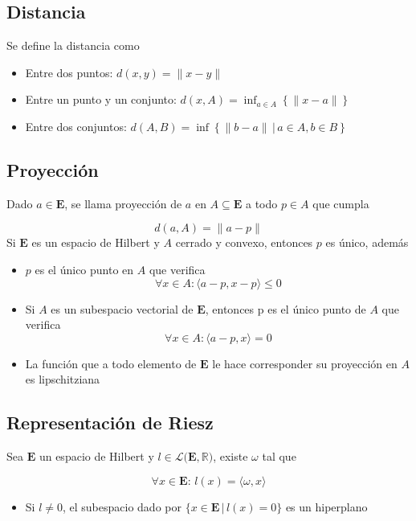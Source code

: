 \subsection{Distancia}

Se define la distancia como

\begin{itemize}
    \item Entre dos puntos: $d(x,y)=\|x-y\|$
    \item Entre un punto y un conjunto: $d(x,A)=\inf_{a\in A}\left\{\|x-a\|\right\}$
    \item Entre dos conjuntos: $d(A,B)=\inf\left\{\|b-a\|\,|\,a\in A, b\in B\right\}$
\end{itemize}

\subsection{Proyección}

Dado $a\in\mathbf{E}$, se llama proyección de $a$ en $A\subseteq\mathbf{E}$ a todo $p\in A$ que cumpla

\[d(a,A) = \|a-p\|\]
\bigbreak
Si $\mathbf{E}$ es un espacio de Hilbert y $A$ cerrado y convexo, entonces $p$ es único, además

\begin{itemize}
    \item $p$ es el único punto en $A$ que verifica
    \[\forall x\in A: \langle a-p, x-p\rangle\leq 0\]
    \item Si $A$ es un subespacio vectorial de $\mathbf{E}$, entonces p es el único punto de $A$ que verifica
    \[\forall x\in A: \langle a-p, x\rangle = 0\]
    \item La función que a todo elemento de $\mathbf{E}$ le hace corresponder su proyección en $A$ es lipschitziana
\end{itemize}

\subsection{Representación de Riesz}
\label{Rep.Riesz}
Sea $\mathbf{E}$ un espacio de Hilbert y $l\in\mathcal{L}(\mathbf{E},\mathbb{R)}$, existe $\omega$ tal que

\[\forall x\in\mathbf{E}:\,l(x)=\langle\omega,x\rangle\]

\begin{itemize}
    \item Si $l\neq 0$, el subespacio dado por $\{x\in\mathbf{E}\,|\,l(x)=0\}$ es un hiperplano
\end{itemize}

